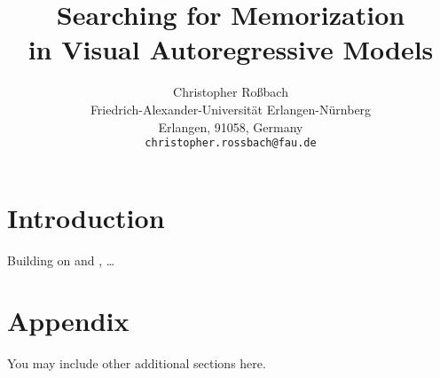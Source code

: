 \documentclass{article} %
\title{Searching for Memorization\\in Visual Autoregressive Models}
\author{Christopher Roßbach\\
Friedrich-Alexander-Universität Erlangen-Nürnberg \\
Erlangen, 91058, Germany \\
\texttt{christopher.rossbach@fau.de}}
\begin{document}
\maketitle

\begin{abstract}
\end{abstract}
\section{Introduction}
Building on \citet{tianVisualAutoregressiveModeling2024} and \citet{wangLocalizingMemorizationSSL2024}, \ldots





\appendix
\section{Appendix}
You may include other additional sections here.
\end{document}
